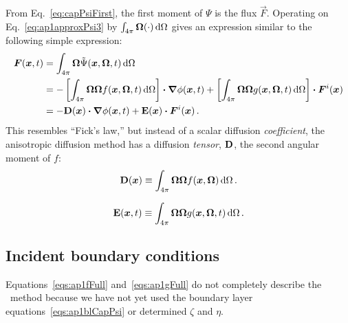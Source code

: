 From Eq.~\eqref{eq:capPsiFirst}, the first moment of $\Psi$ is the flux
$\vec{F}$. Operating on Eq.~\eqref{eq:ap1approxPsi3} by $\int_{4\pi}
\bm{\Omega} (\cdot) \mathop{}\!\mathrm{d}\Omega$ gives an expression similar to 
the following simple expression:
\begin{align} \nonumber
  \bm{F}(\bm{x}, t)
  &= \int_{4\pi} \bm{\Omega} \tilde \Psi(\bm{x}, \bm{\Omega}, t) \mathop{}\!\mathrm{d}\Omega
  \\ \nonumber
  &= 
  - \left[ \int_{4\pi} \bm{\Omega} \bm{\Omega} f(\bm{x}, \bm{\Omega}, t)
  \mathop{}\!\mathrm{d}\Omega \right]
  \bm{\cdot} \bm{\nabla} \phi(\bm{x},t)
  + \left[ \int_{4\pi} \bm{\Omega} \bm{\Omega} g(\bm{x}, \bm{\Omega}, t)
  \mathop{}\!\mathrm{d}\Omega \right]
  \bm{\cdot} \bm{F}^i(\bm{x})
  \\ \label{eq:ap1Ficks}
  &= - \mathbf{D}(\bm{x}) \bm{\cdot} \bm{\nabla} \phi(\bm{x},t)
  + \mathbf{E}(\bm{x}) \bm{\cdot} \bm{F}^i(\bm{x})\,.
\end{align}
This resembles ``Fick's law,'' but instead of a scalar diffusion
\emph{coefficient},
the anisotropic diffusion method has a diffusion \emph{tensor}, $\mathbf{D}$, the
second angular moment of $f$:
\begin{equation}\label{eq:ap1dDefinition}
  \mathbf{D}(\bm{x}) \equiv \int_{4\pi} \bm{\Omega} \bm{\Omega}
  f(\bm{x}, \bm{\Omega}) \mathop{}\!\mathrm{d}\Omega \,.
\end{equation}

\begin{equation}\label{eq:ap1eDefinition}
  \mathbf{E}(\bm{x}, t) \equiv \int_{4\pi} \bm{\Omega} \bm{\Omega}
  g(\bm{x}, \bm{\Omega}, t) \mathop{}\!\mathrm{d}\Omega \,.
\end{equation}

\subsection{Incident boundary conditions}
Equations~\eqref{eqs:ap1fFull} and~\eqref{eqs:ap1gFull} do not completely
describe the \APone\ method because we have not yet used the boundary layer
equations~\eqref{eqs:ap1blCapPsi} or determined $\zeta$ and $\eta$.

